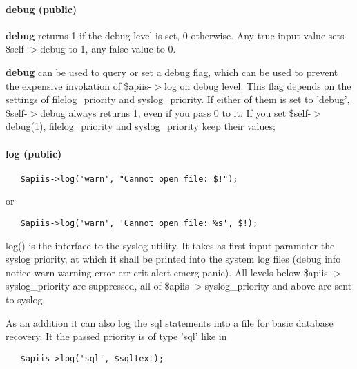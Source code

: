 \paragraph*{debug (public)\label{Apiis::Init_--_Basic_initialisation_object_for_the_complete_APIIS_structure_debug_public_}}


\textbf{debug} returns 1 if the debug level is set, 0 otherwise.
Any true input value sets \$self-$>$debug to 1, any false value to 0.



\textbf{debug} can be used to query or set a debug flag, which can be used to
prevent the expensive invokation of \$apiis-$>$log on debug level. This flag
depends on the settings of filelog\_priority and syslog\_priority. If either of
them is set to 'debug', \$self-$>$debug always returns 1, even if you pass 0
to it. If you set \$self-$>$debug(1), filelog\_priority and syslog\_priority keep
their values;

\paragraph*{log (public)\label{Apiis::Init_--_Basic_initialisation_object_for_the_complete_APIIS_structure_log_public_}}
\begin{verbatim}
   $apiis->log('warn', "Cannot open file: $!");
\end{verbatim}


or

\begin{verbatim}
   $apiis->log('warn', 'Cannot open file: %s', $!);
\end{verbatim}


log() is the interface to the syslog utility. It takes as first input
parameter the syslog priority, at which it shall be printed into the system
log files (debug info notice warn warning error err crit alert emerg
panic). All levels below \$apiis-$>$syslog\_priority are suppressed, all of
\$apiis-$>$syslog\_priority and above are sent to syslog.



As an addition it can also log the sql statements into a file for basic
database recovery. It the passed priority is of type 'sql' like in

\begin{verbatim}
   $apiis->log('sql', $sqltext);
\end{verbatim}



